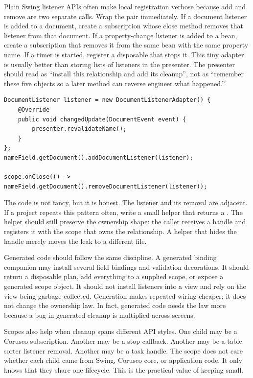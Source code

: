 Plain Swing listener APIs often make local registration verbose because add and
remove are two separate calls. Wrap the pair immediately. If a document
listener is added to a document, create a subscription whose close method
removes that listener from that document. If a property-change listener is
added to a bean, create a subscription that removes it from the same bean with
the same property name. If a timer is started, register a disposable that stops
it. This tiny adapter is usually better than storing lists of listeners in the
presenter. The presenter should read as ``install this relationship and add its
cleanup'', not as ``remember these five objects so a later method can reverse
engineer what happened.''

\begin{lstlisting}[caption={Wrapping a plain Swing listener as a subscription.}]
DocumentListener listener = new DocumentListenerAdapter() {
    @Override
    public void changedUpdate(DocumentEvent event) {
        presenter.revalidateName();
    }
};
nameField.getDocument().addDocumentListener(listener);

scope.onClose(() -> nameField.getDocument().removeDocumentListener(listener));
\end{lstlisting}

The code is not fancy, but it is honest. The listener and its removal are
adjacent. If a project repeats this pattern often, write a small helper that
returns a . The helper should still preserve the ownership
shape: the caller receives a handle and registers it with the scope that owns
the relationship. A helper that hides the handle merely moves the leak to a
different file.

Generated code should follow the same discipline. A generated binding companion
may install several field bindings and validation decorations. It should return
a disposable plan, add everything to a supplied scope, or expose a generated
scope object. It should not install listeners into a view and rely on the view
being garbage-collected. Generation makes repeated wiring cheaper; it does not
change the ownership law. In fact, generated code needs the law more because a
bug in generated cleanup is multiplied across screens.

Scopes also help when cleanup spans different API styles. One child may be a
Corusco subscription. Another may be a  stop callback. Another may
be a table sorter listener removal. Another may be a task handle. The scope
does not care whether each child came from Swing, Corusco core, or application
code. It only knows that they share one lifecycle. This is the practical value
of keeping  small.

